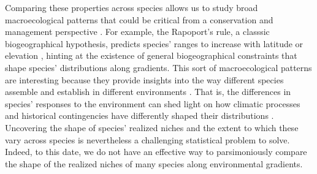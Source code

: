 \documentclass[11pt, a4paper]{article}
\begin{document}
Comparing these properties across species allows us to study broad macroecological patterns that could be critical from a conservation and management perspective \citep{stevensElevationalGradientAltitudinal1992, channellDynamicBiogeographyConservation2000}. For example, the Rapoport's rule, a classsic biogeographical hypothesis, predicts species' ranges to increase with latitude or elevation \citep{stevensElevationalGradientAltitudinal1992}, hinting at the existence of general biogeographical constraints that shape species' distributions along gradients. This sort of macroecological patterns are interesting because they provide insights into the way different species assemble and establish in different environments \citep{linderGeographicRangeStructure2000}. That is, the differences in species' responses to the environment can shed light on how climatic processes and historical contingencies have differently shaped their distributions \citep{rohdeLatitudinalGradientsSpecies1992, helmuthBIOPHYSICSPHYSIOLOGICALECOLOGY2004, siefertHowClimateDispersal2015}. Uncovering the shape of species' realized niches and the extent to which these vary across species is nevertheless a challenging statistical problem to solve. Indeed, to this date, we do not have an effective way to parsimoniously compare the shape of the realized niches of many species along environmental gradients.
\end{document}
